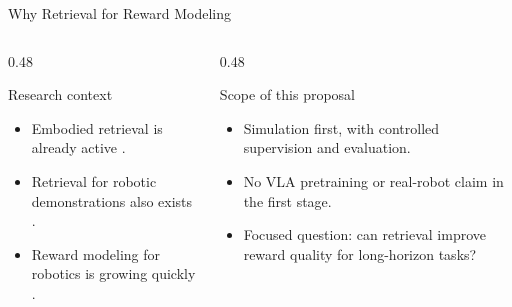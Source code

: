 \documentclass[aspectratio=169,11pt]{beamer}
\begin{document}
\begin{frame}[t]{Why Retrieval for Reward Modeling}
\small
\begin{columns}[T,totalwidth=\textwidth]
  \begin{column}{0.48\textwidth}
    \begin{block}{Research context}
      \begin{itemize}
        \item Embodied retrieval is already active \citep{liu2024embodiedrag,li2025embodiedrag,xu2024raea}.
        \item Retrieval for robotic demonstrations also exists \citep{johns2024dinobot,huang2025strap,jain2024vid2robot}.
        \item Reward modeling for robotics is growing quickly \citep{ma2024vlmfeedback,yang2025rgvlm,song2026roboreward}.
      \end{itemize}
    \end{block}
  \end{column}
  \begin{column}{0.48\textwidth}
    \begin{block}{Scope of this proposal}
      \begin{itemize}
        \item Simulation first, with controlled supervision and evaluation.
        \item No VLA pretraining or real-robot claim in the first stage.
        \item Focused question: can retrieval improve reward quality for long-horizon tasks?
      \end{itemize}
    \end{block}
  \end{column}
\end{columns}
\end{frame}
\end{document}
